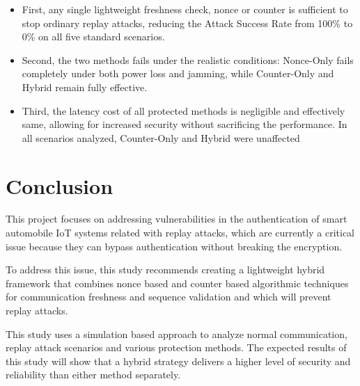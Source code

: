 \documentclass[a4paper,man,12pt]{article}
\begin{document}
\begin{itemize}
    \item First, any single lightweight freshness check, nonce or counter is sufficient to stop ordinary replay attacks, reducing the Attack Success Rate from 100\% to 0\% on all five standard scenarios.

    \item Second, the two methods fails under the realistic conditions: Nonce-Only fails completely under both power loss and jamming, while Counter-Only and Hybrid remain fully effective.

    \item Third, the latency cost of all protected methods is negligible and effectively same, allowing for increased security without sacrificing the performance. In all scenarios analyzed, Counter-Only and Hybrid were unaffected


\end{itemize}




\pagebreak

\section{Conclusion}
This project focuses on addressing vulnerabilities in the authentication of smart automobile IoT systems related with replay attacks, which are currently a critical issue because they can bypass authentication without breaking the encryption.\bigbreak

To address this issue, this study recommends creating a lightweight hybrid framework that combines nonce based and counter based algorithmic techniques for communication freshness and sequence validation and which will prevent replay attacks. \bigbreak

This study uses a simulation based approach to analyze normal communication, replay attack scenarios and various protection methods. The expected results of this study will show that a hybrid strategy delivers a higher level of security and reliability than either method separately.\bigbreak
\end{document}
